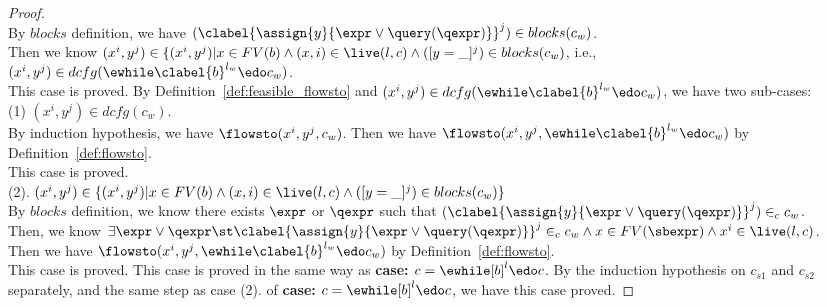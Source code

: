 \begin{proof}
        \\
        By $blocks$ definition, we have $ (\clabel{\assign{y}{\expr \lor \query(\qexpr)}}^{j}) \in blocks(c_w)$. 
        \\
        Then we know $(x^i, y^j) \in \{(x^i,y^j) | x \in FV(b) \land (x,i) \in \live(l, c) \land ([y = \_]^j) \in blocks(c_w)$, i.e., $(x^i, y^j) \in dcfg(\ewhile \clabel{b}^{l_w} \edo c_w)$.
        \\
        This case is proved.
        \subcaseL{$\Longleftarrow$}
        By Definition~\ref{def:feasible_flowsto} and $(x^i, y^j) \in dcfg(\ewhile \clabel{b}^{l_w} \edo c_w)$, we have two sub-cases:
        \\
        (1) $(x^i, y^j) \in dcfg(c_w)$.
        \\
        By induction hypothesis, we have $\flowsto(x^i, y^j, c_w)$. Then we have  $\flowsto(x^i, y^j, \ewhile \clabel{b}^{l_w} \edo c_w)$ by Definition~\ref{def:flowsto}.
        \\
        This case is proved.
        \\
        (2). $(x^i, y^j) \in \{(x^i,y^j) | x \in FV(b) \land (x,i) \in \live(l, c) \land ([y = \_]^j) \in blocks(c_w) \}$
        \\
        By $blocks$ definition, we know there exists $\expr$ or $\qexpr$ such that $ (\clabel{\assign{y}{\expr \lor \query(\qexpr)}}^{j}) \in_c c_w$. 
        \\
        Then, we know $\exists \expr \lor \qexpr \st	\clabel{\assign{y}{\expr \lor \query(\qexpr)}}^{j} \in_{c}  {c_w}  
        \land {x} \in FV(\sbexpr) \land x^i \in \live(l, c)$.
        \\
        Then we have $\flowsto(x^i, y^j, \ewhile \clabel{b}^{l_w} \edo c_w)$ by Definition~\ref{def:flowsto}.
        \\
        This case is proved.
        This case is proved in the same way as \textbf{case: $c = \ewhile [b]^{l} \edo c$}.
       By the induction hypothesis on $c_{s1}$ and $c_{s2}$ separately, and the same step as case (2). of \textbf{case: $c = \ewhile [b]^{l} \edo c$},
       we have this case proved.   
\end{proof}